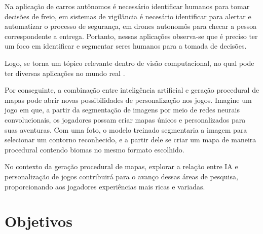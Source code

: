 Na aplicação de carros autônomos é necessário identificar humanos para tomar decisões de freio, em sistemas de vigilância é necesário identificar para alertar e automatizar o processo de segurança, em drones autonomôs para checar a pessoa correspondente a entrega. Portanto, nessas aplicações observa-se que é preciso ter um foco em identificar e segmentar seres humanos para a tomada de decisões.


Logo, se torna um tópico relevante dentro de visão computacional, no qual pode ter diversas aplicações no mundo real \cite{kirillov2019panoptic, dp_semantic_segmantation}.

Por conseguinte, a combinação entre inteligência artificial e geração procedural de mapas pode abrir novas possibilidades de personalização nos jogos. Imagine um jogo em que, a partir da segmentação de imagens por meio de redes neurais convolucionais, os jogadores possam criar mapas únicos e personalizados para suas aventuras. Com uma foto, o modelo treinado segmentaria a imagem para selecionar um contorno reconhecido, e a partir dele se criar um mapa de maneira procedural contendo biomas no mesmo formato escolhido. 

No contexto da geração procedural de mapas, explorar a relação entre IA e personalização de jogos contribuirá para o avanço dessas áreas de pesquisa, proporcionando aos jogadores experiências mais ricas e variadas.



\section{Objetivos}

